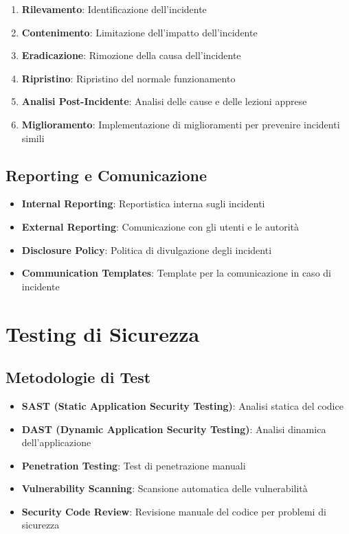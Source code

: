 \begin{enumerate}
    \item \textbf{Rilevamento}: Identificazione dell'incidente
    \item \textbf{Contenimento}: Limitazione dell'impatto dell'incidente
    \item \textbf{Eradicazione}: Rimozione della causa dell'incidente
    \item \textbf{Ripristino}: Ripristino del normale funzionamento
    \item \textbf{Analisi Post-Incidente}: Analisi delle cause e delle lezioni apprese
    \item \textbf{Miglioramento}: Implementazione di miglioramenti per prevenire incidenti simili
\end{enumerate}

\subsection{Reporting e Comunicazione}
\begin{itemize}
    \item \textbf{Internal Reporting}: Reportistica interna sugli incidenti
    \item \textbf{External Reporting}: Comunicazione con gli utenti e le autorità
    \item \textbf{Disclosure Policy}: Politica di divulgazione degli incidenti
    \item \textbf{Communication Templates}: Template per la comunicazione in caso di incidente
\end{itemize}

\section{Testing di Sicurezza}

\subsection{Metodologie di Test}
\begin{itemize}
    \item \textbf{SAST (Static Application Security Testing)}: Analisi statica del codice
    \item \textbf{DAST (Dynamic Application Security Testing)}: Analisi dinamica dell'applicazione
    \item \textbf{Penetration Testing}: Test di penetrazione manuali
    \item \textbf{Vulnerability Scanning}: Scansione automatica delle vulnerabilità
    \item \textbf{Security Code Review}: Revisione manuale del codice per problemi di sicurezza
\end{itemize}

